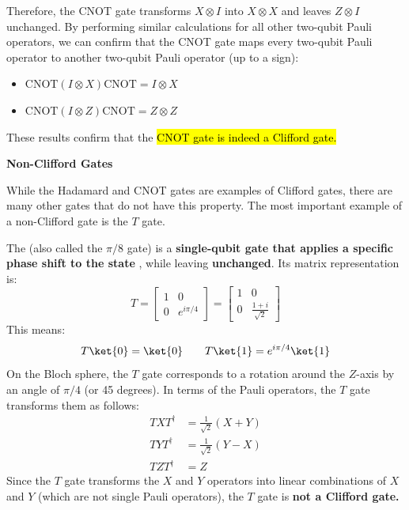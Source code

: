 \begin{examplebox}
    Therefore, the CNOT gate transforms $X \otimes I$ into $X \otimes X$ and leaves $Z \otimes I$ unchanged. By performing similar calculations for all other two-qubit Pauli operators, we can confirm that the CNOT gate maps every two-qubit Pauli operator to another two-qubit Pauli operator (up to a sign):
    \begin{itemize}
        \item $\text{CNOT}\left(I \otimes X\right)\text{CNOT} = I \otimes X$
        \item $\text{CNOT}\left(I \otimes Z\right)\text{CNOT} = Z \otimes Z$
    \end{itemize}
    These results confirm that the \hl{CNOT gate is indeed a Clifford gate.}
\end{examplebox}

\begin{flushleft}
    \textcolor{Red2}{ \textbf{Non-Clifford Gates}}
\end{flushleft}
While the Hadamard and CNOT gates are examples of Clifford gates, there are many other gates that do not have this property. The most important example of a non-Clifford gate is the $T$ gate.

\highspace
The  (also called the $\pi/8$ gate) is a \textbf{single-qubit gate that applies a specific phase shift to the state} , while leaving  \textbf{unchanged}. Its matrix representation is:
\begin{equation}
    T =
    \begin{bmatrix}
        1 & 0 \\
        0 & e^{i\pi/4}
    \end{bmatrix}
    =
    \begin{bmatrix}
        1 & 0 \\[.3em]
        0 & \frac{1 + i}{\sqrt{2}}
    \end{bmatrix}
\end{equation}
This means:
\begin{equation}
    T \ket{0} = \ket{0}
    \qquad
    T \ket{1} = e^{i\pi/4} \ket{1}
\end{equation}
On the Bloch sphere, the $T$ gate corresponds to a rotation around the $Z$-axis by an angle of $\pi/4$ (or 45 degrees). In terms of the Pauli operators, the $T$ gate transforms them as follows:
\begin{equation}
    \begin{aligned}
        T X T^\dagger &=
        \frac{1}{\sqrt{2}} (X + Y) \\
        T Y T^\dagger &=
        \frac{1}{\sqrt{2}} (Y - X) \\
        T Z T^\dagger &=
        Z
    \end{aligned}
\end{equation}
Since the $T$ gate transforms the $X$ and $Y$ operators into linear combinations of $X$ and $Y$ (which are not single Pauli operators), the $T$ gate is \textbf{not a Clifford gate.}

